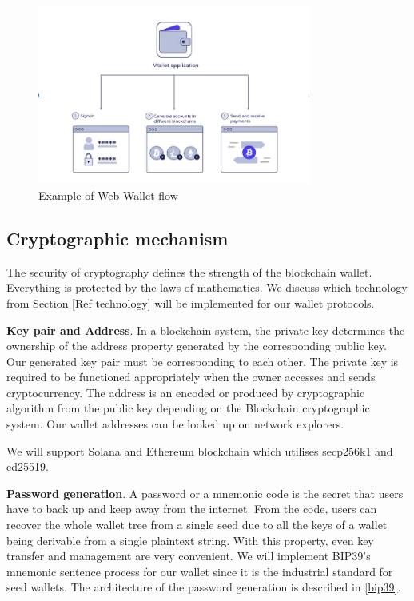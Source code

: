 \begin{figure}[!ht]
    \centering
    \includegraphics[width=0.8\textwidth]{images/webwallet.png}
    \caption[Example of Web Wallet flow]{Example of Web Wallet flow}
    \label{fig:webwallet}
\end{figure}

\subsection{Cryptographic mechanism}
The security of cryptography defines the strength of the blockchain wallet. Everything is protected by the laws of mathematics. We discuss which technology from Section [Ref technology] will be implemented for our wallet protocols.

\bigskip
{\textbf{Key pair and Address}}. In a blockchain system, the private key determines the ownership of the address property generated by the corresponding public key. Our generated key pair must be corresponding to each other. The private key is required to be functioned appropriately when the owner accesses and sends cryptocurrency. The address is an encoded or produced by cryptographic algorithm from the public key depending on the Blockchain cryptographic system. Our wallet addresses can be looked up on network explorers.

We will support Solana and Ethereum blockchain which utilises secp256k1 and ed25519.

\bigskip
{\textbf{Password generation}}. A password or a mnemonic code is the secret that users have to back up and keep away from the internet. From the code, users can recover the whole wallet tree from a single seed due to all the keys of a wallet being derivable from a single plaintext string. With this property, even key transfer and management are very convenient. We will implement BIP39's mnemonic sentence process for our wallet since it is the industrial standard for seed wallets.
The architecture of the password generation is described in \autoref{bip39}.

